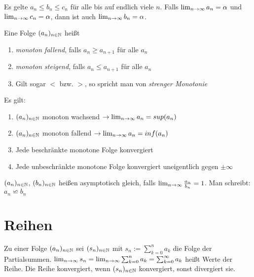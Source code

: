 \begin{satz}[Einschließungsregel]
	Es gelte $a_n \leq b_n \leq c_n$ für alle bis auf endlich viele $n$. Falls $\lim_{n \rightarrow \infty} a_n = \alpha$ und $\lim_{n \rightarrow \infty} c_n = \alpha $, dann ist auch $\lim_{n \rightarrow \infty} b_n = \alpha$.
\end{satz}

\begin{definition}
	Eine Folge $(a_{n})_{n \in \mathbb{N}}$ heißt
	\begin{enumerate}[noitemsep]
		\item \emph{monoton fallend}, falls $a_n \geq a_{n+1}$ für alle $a_n$
		\item \emph{monoton steigend}, falls $a_n \leq a_{n+1}$ für alle $a_n$
		\item Gilt sogar $<$ bzw. $>$, so spricht man von \emph{strenger Monotonie}
	\end{enumerate}
\end{definition}

\begin{satz}
	Es gilt:
	\begin{enumerate}[noitemsep]
		\item $(a_{n})_{n \in \mathbb{N}}$ monoton wachsend $\rightarrow \lim_{n \rightarrow \infty} a_n = sup(a_n)$
		\item $(a_{n})_{n \in \mathbb{N}}$ monoton fallend $\rightarrow \lim_{n \rightarrow \infty} a_n = inf(a_n)$
		\item Jede beschränkte monotone Folge konvergiert
		\item Jede unbeschränkte monotone Folge konvergiert uneigentlich gegen $\pm \infty$
	\end{enumerate}
\end{satz}

\begin{definition}
	 $(a_{n})_{n \in \mathbb{N}}$,  $(b_{n})_{n \in \mathbb{N}}$ heißen asymptotisch gleich, falls $\lim_{n \rightarrow \infty} \frac{a_n}{b_n} = 1$. Man schreibt: $a_n \backsimeq b_n$
\end{definition}

\section{Reihen}


\begin{definition}
	Zu einer Folge $(a_{n})_{n \in \mathbb{N}}$ sei $(s_n)_{n \in \mathbb{N}}$ mit $s_n := \sum_{k=0}^{n} a_k$ die Folge der Partialsummen. $\lim_{n \rightarrow \infty} s_n = \lim_{n \rightarrow \infty} \sum_{k=0}^{n} a_k = \sum_{k = 0}^{\infty} a_{k}$ heißt Werte der Reihe. Die Reihe konvergiert, wenn $(s_n)_{n \in \mathbb{N}}$ konvergiert, sonst divergiert sie.
\end{definition}

